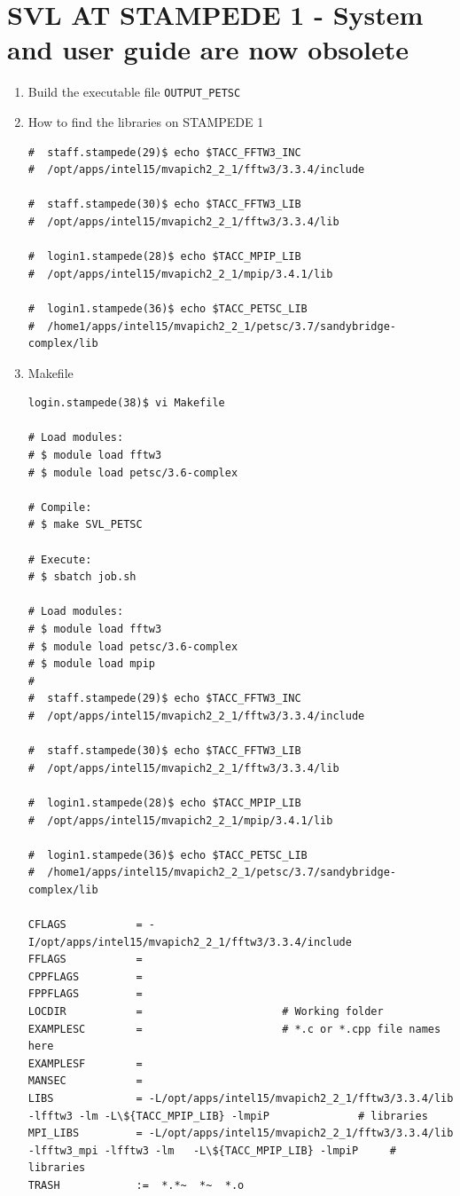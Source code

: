 \documentclass{article}
\begin{document}

\section{SVL AT STAMPEDE 1 - System and user guide are now obsolete}    
\begin{enumerate}
\item Build the executable file \verb+OUTPUT_PETSC+
\item How to find the libraries on STAMPEDE 1
\scriptsize
\begin{verbatim}
#  staff.stampede(29)$ echo $TACC_FFTW3_INC
#  /opt/apps/intel15/mvapich2_2_1/fftw3/3.3.4/include

#  staff.stampede(30)$ echo $TACC_FFTW3_LIB
#  /opt/apps/intel15/mvapich2_2_1/fftw3/3.3.4/lib

#  login1.stampede(28)$ echo $TACC_MPIP_LIB
#  /opt/apps/intel15/mvapich2_2_1/mpip/3.4.1/lib

#  login1.stampede(36)$ echo $TACC_PETSC_LIB
#  /home1/apps/intel15/mvapich2_2_1/petsc/3.7/sandybridge-complex/lib
\end{verbatim}
\normalsize
\item Makefile
\tiny
\begin{verbatim}
login.stampede(38)$ vi Makefile 

# Load modules:
# $ module load fftw3
# $ module load petsc/3.6-complex

# Compile:
# $ make SVL_PETSC

# Execute:
# $ sbatch job.sh

# Load modules:
# $ module load fftw3
# $ module load petsc/3.6-complex
# $ module load mpip
#
#  staff.stampede(29)$ echo $TACC_FFTW3_INC
#  /opt/apps/intel15/mvapich2_2_1/fftw3/3.3.4/include

#  staff.stampede(30)$ echo $TACC_FFTW3_LIB
#  /opt/apps/intel15/mvapich2_2_1/fftw3/3.3.4/lib

#  login1.stampede(28)$ echo $TACC_MPIP_LIB
#  /opt/apps/intel15/mvapich2_2_1/mpip/3.4.1/lib

#  login1.stampede(36)$ echo $TACC_PETSC_LIB
#  /home1/apps/intel15/mvapich2_2_1/petsc/3.7/sandybridge-complex/lib

CFLAGS	         = -I/opt/apps/intel15/mvapich2_2_1/fftw3/3.3.4/include
FFLAGS	         = 
CPPFLAGS         = 
FPPFLAGS         =
LOCDIR           =  					# Working folder
EXAMPLESC        =  					# *.c or *.cpp file names here
EXAMPLESF        =
MANSEC           = 
LIBS             = -L/opt/apps/intel15/mvapich2_2_1/fftw3/3.3.4/lib -lfftw3 -lm -L\${TACC_MPIP_LIB} -lmpiP  			# libraries
MPI_LIBS         = -L/opt/apps/intel15/mvapich2_2_1/fftw3/3.3.4/lib -lfftw3_mpi -lfftw3 -lm   -L\${TACC_MPIP_LIB} -lmpiP     # libraries	
TRASH            :=  *.*~  *~  *.o
 

\end{verbatim}
\end{enumerate}
\end{document}
